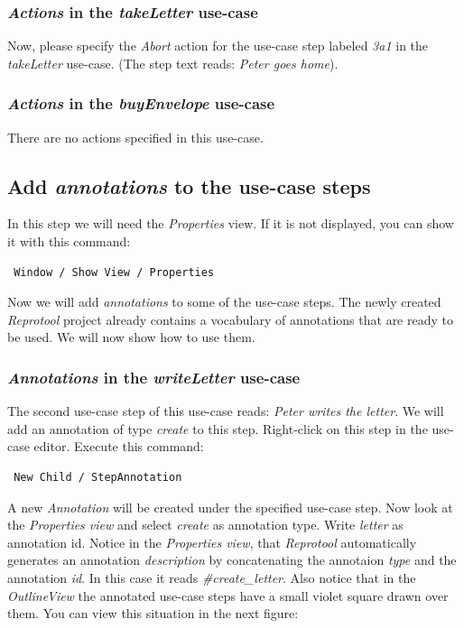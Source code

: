 \subsubsection{\emph{Actions} in the \emph{takeLetter} use-case}

Now, please specify the \emph{Abort} action for the use-case step labeled \emph{3a1} in the \emph{takeLetter} use-case. (The step text
reads: \emph{Peter goes home}).

\subsubsection{\emph{Actions} in the \emph{buyEnvelope} use-case}
There are no actions specified in this use-case.

\newpage

\subsection{Add \emph{annotations} to the use-case steps}

In this step we will need the \emph{Properties} view. If it is not displayed, you can show it with this command:
\begin{verbatim}
 Window / Show View / Properties
\end{verbatim}

Now we will add \emph{annotations} to some of the use-case steps. The newly created \emph{Reprotool} project already contains a vocabulary
of annotations that are ready to be used. We will now show how to use them.

\subsubsection{\emph{Annotations} in the \emph{writeLetter} use-case}
The second use-case step of this use-case reads: \emph{Peter writes the letter}. We will add an annotation of
type \emph{create} to this step. Right-click on this step in the use-case editor. Execute this command:
\begin{verbatim}
 New Child / StepAnnotation
\end{verbatim}
A new \emph{Annotation} will be created under the specified use-case step. Now look at the \emph{Properties view} and select
\emph{create} as annotation type. Write \emph{letter} as annotation id. Notice in the \emph{Properties view}, that \emph{Reprotool}
automatically generates an annotation \emph{description} by concatenating the annotaion \emph{type} and the annotation \emph{id}.
In this case it reads \emph{\#create\_letter}.
Also notice that in the \emph{OutlineView} the annotated use-case steps have a small violet square drawn over them. You can view this
situation in the next figure:

